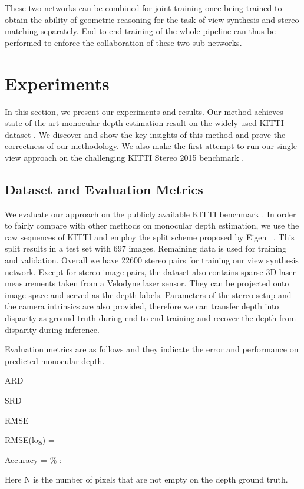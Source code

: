 \documentclass[10pt,twocolumn,letterpaper]{article}
\begin{document}
These two networks can be combined for joint training once being trained to obtain the ability of geometric reasoning for the task of view synthesis and stereo matching separately. End-to-end training of the whole pipeline can thus be performed to enforce the collaboration of these two sub-networks.

\section{Experiments}
In this section, we present our experiments and results. Our method achieves state-of-the-art monocular depth estimation result on the widely used KITTI dataset \cite{Geiger2012CVPR}. We discover and show the key insights of this method and prove the correctness of our methodology. We also make the first attempt to run our single view approach on the challenging KITTI Stereo 2015 benchmark \cite{Menze2015CVPR}.

\subsection{Dataset and Evaluation Metrics}
We evaluate our approach on the publicly available KITTI benchmark \cite{Geiger2012CVPR}. In order to fairly compare with other methods on monocular depth estimation, we use the raw sequences of KITTI and employ the split scheme proposed by Eigen \etal~\cite{eigen2014depth}. This split results in a test set with 697 images. Remaining data is used for training and validation. Overall we have 22600 stereo pairs for training our view synthesis network. Except for stereo image pairs, the dataset also contains sparse 3D laser measurements taken from a Velodyne laser sensor. They can be projected onto image space and served as the depth labels. Parameters of the stereo setup and the camera intrinsics are also provided, therefore we can transfer depth into disparity as ground truth during end-to-end training and recover the depth from disparity during inference.

Evaluation metrics are as follows and they indicate the error and performance on predicted monocular depth.

ARD = 

SRD = 

RMSE = 

RMSE(log) = 

Accuracy = \%  : 

Here N is the number of pixels that are not empty on the depth ground truth.
\end{document}
